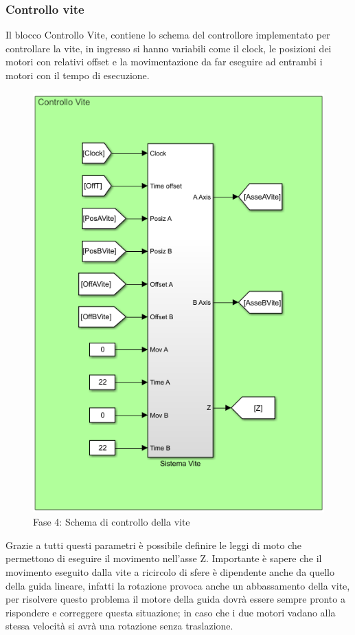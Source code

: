 \subsubsection*{Controllo vite}
Il blocco Controllo Vite, contiene lo schema del controllore implementato per controllare la vite, in ingresso si hanno variabili come il clock, le posizioni dei motori con relativi offset e la movimentazione da far eseguire ad entrambi i motori con il tempo di esecuzione.
\begin{figure}[ht]
	\begin{center}
		\includegraphics[scale=0.7]{Immagini/Sperimentale/ControlloViteSchema}
		\caption{Fase 4: Schema di controllo della vite}
		\label{fig:ControlloVite}
	\end{center}
\end{figure}
Grazie a tutti questi parametri è possibile definire le leggi di moto che permettono di eseguire il movimento nell'asse Z. Importante è sapere che il movimento eseguito dalla vite a ricircolo di sfere è dipendente anche da quello della guida lineare, infatti la rotazione provoca anche un abbassamento della vite, per risolvere questo problema il motore della guida dovrà essere sempre pronto a rispondere e correggere questa situazione; in caso che i due motori vadano alla stessa velocità si avrà una rotazione senza traslazione.
